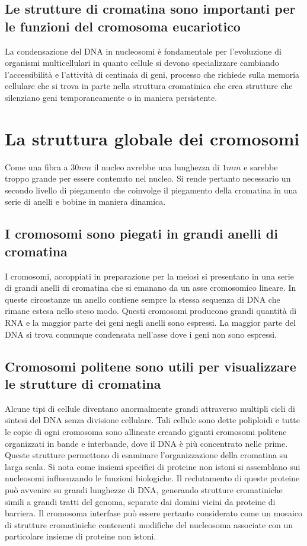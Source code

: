 \subsection{Le strutture di cromatina sono importanti per le funzioni del cromosoma eucariotico}
La condensazione del DNA in nucleosomi \`e fondamentale per l'evoluzione di organismi multicellulari in quanto cellule si devono specializzare cambiando l'accessibilit\`a e l'attivit\`a
di centinaia di geni, processo che richiede sulla memoria cellulare che si trova in parte nella struttura cromatinica che crea strutture che silenziano geni temporaneamente o in 
maniera persistente.
\section{La struttura globale dei cromosomi}
Come una fibra a $30nm$ il nucleo avrebbe una lunghezza di $1mm$ e sarebbe troppo grande per essere contenuto nel nucleo. Si rende pertanto necessario un secondo livello di piegamento
che coinvolge il piegamento della cromatina in una serie di anelli e bobine in maniera dinamica.
\subsection{I cromosomi sono piegati in grandi anelli di cromatina}
I cromosomi, accoppiati in preparazione per la meiosi si presentano in una serie di grandi anelli di cromatina che si emanano da un asse cromosomico lineare. In queste circostanze un
anello contiene sempre la stessa sequenza di DNA che rimane estesa nello steso modo. Questi cromosomi producono grandi quantit\`a di RNA e la maggior parte dei geni negli anelli sono
espressi. La maggior parte del DNA si trova comunque condensata nell'asse dove i geni non sono espressi. 
\subsection{Cromosomi politene sono utili per visualizzare le strutture di cromatina}
Alcune tipi di cellule diventano anormalmente grandi attraverso multipli cicli di sintesi del DNA senza divisione cellulare. Tali cellule sono dette poliploidi e tutte le copie di ogni 
cromosoma sono allineate creando giganti cromosomi politene organizzati in bande e interbande, dove il DNA \`e pi\`u concentrato nelle prime. Queste strutture permettono di esaminare 
l'organizzazione della cromatina su larga scala. Si nota come insiemi specifici di proteine non istoni si assemblano sui nucleosomi influenzando le funzioni biologiche. Il reclutamento
di queste proteine pu\`o avvenire su grandi lunghezze di DNA, generando strutture cromatiniche simili a grandi tratti del genoma, separate dai domini vicini da proteine di barriera. Il
cromosoma interfase pu\`o essere pertanto considerato come un mosaico di strutture cromatiniche contenenti modifiche del nucleosoma associate con un particolare insieme di proteine non
istoni. 
